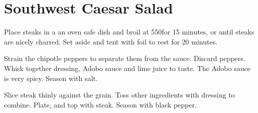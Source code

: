 \section{Southwest Caesar Salad}
\begin{recipe}



Place steaks in a an oven safe dish and broil at 550\degree for 15 minutes, or until steaks are nicely charred. Set aside and tent with foil to rest for 20 minutes.


Strain the chipotle peppers to separate them from the sauce. Discard peppers. Whisk together dressing, Adobo sauce and lime juice to taste. The Adobo sauce is very spicy. Season with salt.


Slice steak thinly against the grain. Toss other ingredients with dressing to combine. Plate, and top with steak. Season with black pepper.


\end{recipe}
